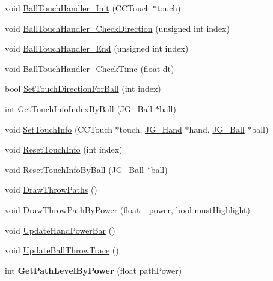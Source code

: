 \begin{DoxyCompactItemize}
\item 
void \hyperlink{class_j_g___game___main_afe6f0284267c514ca1c81673d015ad91}{Ball\-Touch\-Handler\-\_\-\-Init} (C\-C\-Touch $\ast$touch)
\item 
void \hyperlink{class_j_g___game___main_aa0d9b99e2acd78c8763557d1c0e8a244}{Ball\-Touch\-Handler\-\_\-\-Check\-Direction} (unsigned int index)
\item 
void \hyperlink{class_j_g___game___main_af02d329a7f3a6ac86d8b233dd9ff0741}{Ball\-Touch\-Handler\-\_\-\-End} (unsigned int index)
\item 
void \hyperlink{class_j_g___game___main_a4accf9781acdb8a94450eca925574902}{Ball\-Touch\-Handler\-\_\-\-Check\-Time} (float dt)
\item 
bool \hyperlink{class_j_g___game___main_a0fab6585f29f1324aea00bdade4e01f4}{Set\-Touch\-Direction\-For\-Ball} (int index)
\item 
int \hyperlink{class_j_g___game___main_a4af4d54f9da2a785f7c1965dfd5630ec}{Get\-Touch\-Info\-Index\-By\-Ball} (\hyperlink{class_j_g___ball}{J\-G\-\_\-\-Ball} $\ast$ball)
\item 
void \hyperlink{class_j_g___game___main_abda6daf16a4bdfb1d197bcedce380f8e}{Set\-Touch\-Info} (C\-C\-Touch $\ast$touch, \hyperlink{class_j_g___hand}{J\-G\-\_\-\-Hand} $\ast$hand, \hyperlink{class_j_g___ball}{J\-G\-\_\-\-Ball} $\ast$ball)
\item 
void \hyperlink{class_j_g___game___main_a24a120d001b984dc67f211cdb79ce811}{Reset\-Touch\-Info} (int index)
\item 
void \hyperlink{class_j_g___game___main_a2f8dd795fb006e6b052dbe29aef917cf}{Reset\-Touch\-Info\-By\-Ball} (\hyperlink{class_j_g___ball}{J\-G\-\_\-\-Ball} $\ast$ball)
\item 
void \hyperlink{class_j_g___game___main_ac44ff31e786844c793f1d0b78bb328b2}{Draw\-Throw\-Paths} ()
\item 
void \hyperlink{class_j_g___game___main_a2ffff5b2b2e4978e0e831cebb053d389}{Draw\-Throw\-Path\-By\-Power} (float \-\_\-power, bool must\-Highlight)
\item 
void \hyperlink{class_j_g___game___main_a329527c04ab8828daf10770823a4510f}{Update\-Hand\-Power\-Bar} ()
\item 
void \hyperlink{class_j_g___game___main_afdd489bafbd92fc662e1142bc14156f1}{Update\-Ball\-Throw\-Trace} ()
\item 
\hypertarget{class_j_g___game___main_a2d763a885097326f3bfce0ecd8c974fc}{int {\bfseries Get\-Path\-Level\-By\-Power} (float path\-Power)}\label{class_j_g___game___main_a2d763a885097326f3bfce0ecd8c974fc}


\end{DoxyCompactItemize}
